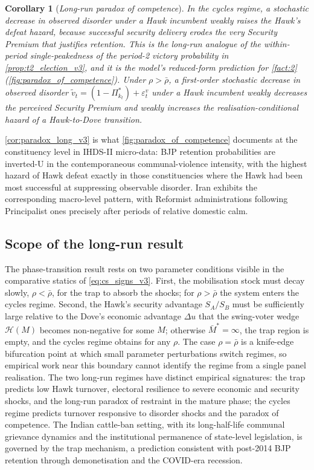\documentclass[11pt,twoside]{extarticle}
\newtheorem{corollary}{Corollary}
\begin{document}
\begin{corollary}[\emph{Long-run paradox of competence}]\label{cor:paradox_long_v3}
\emph{In the cycles regime, a stochastic decrease in observed disorder under a Hawk incumbent weakly raises the Hawk's defeat hazard, because successful security delivery erodes the very Security Premium that justifies retention. This is the long-run analogue of the within-period single-peakedness of the period-2 victory probability in \autoref{prop:t2_election_v3}, and it is the model's reduced-form prediction for \autoref{fact:2} (\autoref{fig:paradox_of_competence}).}
Under $\rho>\bar\rho$, a first-order stochastic decrease in observed disorder $\tilde v_t=(1-\Pi_{k_t}^*)+\varepsilon_t^v$ under a Hawk incumbent weakly decreases the perceived Security Premium and weakly increases the realisation-conditional hazard of a Hawk-to-Dove transition.
\end{corollary}

\autoref{cor:paradox_long_v3} is what \autoref{fig:paradox_of_competence} documents at the constituency level in IHDS-II micro-data: BJP retention probabilities are inverted-U in the contemporaneous communal-violence intensity, with the highest hazard of Hawk defeat exactly in those constituencies where the Hawk had been most successful at suppressing observable disorder. Iran exhibits the corresponding macro-level pattern, with Reformist administrations following Principalist ones precisely after periods of relative domestic calm.

\subsection{Scope of the long-run result}\label{subsec:scope_long_v3}

The phase-transition result rests on two parameter conditions visible in the comparative statics of \autoref{eq:cs_signs_v3}. First, the mobilisation stock must decay slowly, $\rho<\bar\rho$, for the trap to absorb the shocks; for $\rho>\bar\rho$ the system enters the cycles regime. Second, the Hawk's security advantage $S_A/S_B$ must be sufficiently large relative to the Dove's economic advantage $\Delta u$ that the swing-voter wedge $\mathcal H(M)$ becomes non-negative for some $M$; otherwise $\bar M^*=\infty$, the trap region is empty, and the cycles regime obtains for any $\rho$. The case $\rho=\bar\rho$ is a knife-edge bifurcation point at which small parameter perturbations switch regimes, so empirical work near this boundary cannot identify the regime from a single panel realisation. The two long-run regimes have distinct empirical signatures: the trap predicts low Hawk turnover, electoral resilience to severe economic and security shocks, and the long-run paradox of restraint in the mature phase; the cycles regime predicts turnover responsive to disorder shocks and the paradox of competence. The Indian cattle-ban setting, with its long-half-life communal grievance dynamics and the institutional permanence of state-level legislation, is governed by the trap mechanism, a prediction consistent with post-2014 BJP retention through demonetisation and the COVID-era recession.
\end{document}
